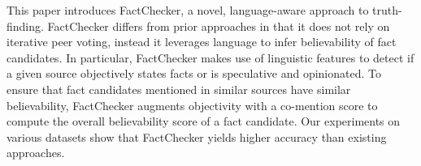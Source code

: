 This paper introduces FactChecker, a novel, language-aware approach to truth-finding. FactChecker differs from prior approaches in that it does not rely on iterative peer voting, instead it leverages language to infer believability of fact candidates. In particular, FactChecker makes use of linguistic features to detect if a given source objectively states facts or is speculative and opinionated. To ensure that fact candidates mentioned in similar sources have similar believability, FactChecker augments objectivity with a co-mention score to compute the overall believability score of a fact candidate. Our experiments on various datasets show that FactChecker yields higher accuracy than existing approaches.
